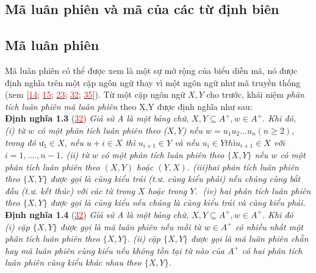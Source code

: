 \begin{flushleft}
\section{Mã luân phiên và mã của các từ định biên}
\subsection{Mã luân phiên}
Mã luân phiên có thể được xem là một sự mở rộng của biểu diễn mã, nó được định nghĩa trên một cặp ngôn ngữ thay vì một ngôn ngữ như mã truyền thống (xem [\hyperlink{page.81}{\textcolor{red}{14}}; \hyperlink{page.81}{\textcolor{red}{15}}; \hyperlink{page.81}{\textcolor{red}{23}}; \hyperlink{page.81}{\textcolor{red}{32}}; \hyperlink{page.81}{\textcolor{red}{35}}]). Từ một cặp ngôn ngữ $X, Y$ cho trước, khái niệm \textit{phân tích luân phiên mã luân phiên} theo X,Y được định nghĩa như sau: \\
\textbf{Định nghĩa 1.3} (\hyperlink{page.81}{\textcolor{red}{32}}) \textit{Giả sử A là một bảng chữ, $X, Y \subseteq A^+ , w \in A^+$. Khi đó, \\
\hspace{10mm}(i) từ $w$ có một phân tích luân phiên theo ($X, Y$) nếu $w = u_1u_2...u_n (n \ge 2)$, trong đó $ư_1 \in X$, nếu $u+i \in X$ thì $u_{i+1} \in Y$ và nếu $u_i \in Y thì u_{i+1} \in X $ với $ i = 1,....,n-1$.
\hspace{10mm}(ii) từ $w$ có một phân tích luân phiên theo $\{ X, Y \}$ nếu $w$ có một phân tích luân phiên theo $(X, Y)$ hoặc $(Y, X)$.
\hspace{10mm}(iii)hai phân tích luân phiên theo $\{ X, Y \}$ được gọi là cùng kiểu trái (t.ư. cùng kiểu phải) nếu chúng cùng bắt đầu (t.ư. kết thúc) với các từ trong $X$ hoặc trong $Y$.
\hspace{10mm}(iv)  hai phân tích luân phiên theo $\{ X, Y \}$ được gọi là cùng kiểu nếu chúng là cùng kiểu trái và cùng kiểu phải.
}
\textbf{Định nghĩa 1.4} (\hyperlink{page.81}{\textcolor{red}{32}}) \textit{Gỉả sử A là một bảng chữ, $X, Y \subseteq A^+, w \in A^+$. Khi đó \\
\hspace{10mm}(i) cặp $\{ X,Y \}$ được gọi là mã luân phiên nếu mỗi từ $w \in A^+$ có nhiều nhất một phân tích luân phiên theo $\{ X,Y \}$.
\hspace{10mm}(ii) cặp $\{ X,Y \}$ được gọi là mã luân phiên chẵn hay mã luân phiên cùng kiểu nếu không tồn tại từ nào của $A^+$ có hai phân tích luân phiên cùng kiểu khác nhau theo $\{X,Y\}$.
}

\end{flushleft}
